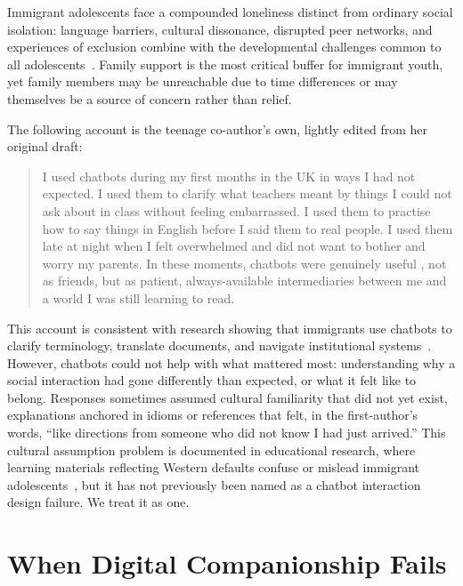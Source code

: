 \documentclass[manuscript]{acmart}
\begin{document}
Immigrant adolescents face a compounded loneliness distinct from ordinary social isolation:
language barriers, cultural dissonance, disrupted peer networks, and experiences of exclusion
combine with the developmental challenges common to all adolescents~\cite{aalto2025patterns}.
Family support is the most critical buffer for immigrant youth, yet family members may be
unreachable due to time differences or may themselves be a source of concern rather than relief.

The following account is the teenage co-author's own, lightly edited from her original draft:

\begin{quote}
I used chatbots during my first months in the UK in ways I had not expected. I used them to
clarify what teachers meant by things I could not ask about in class without feeling
embarrassed. I used them to practise how to say things in English before I said them to real
people. I used them late at night when I felt overwhelmed and did not want to bother and worry my parents.
In these moments, chatbots were genuinely useful , not as friends, but as patient,
always-available intermediaries between me and a world I was still learning to read.
\end{quote}

This account is consistent with research showing that immigrants use chatbots to clarify
terminology, translate documents, and navigate institutional
systems~\cite{Hosseini2025,DekkerEngbersen2014}. However, chatbots could not help with what
mattered most: understanding why a social interaction had gone differently than expected, or
what it felt like to belong. Responses sometimes assumed cultural familiarity that did not yet
exist, explanations anchored in idioms or references that felt, in the first-author's words,
``like directions from someone who did not know I had just arrived.'' This cultural
assumption problem is documented in educational research, where learning materials
reflecting Western defaults confuse or mislead immigrant adolescents~\cite{Tozadore2026}, but
it has not previously been named as a chatbot interaction design failure. We treat it as one.


\section{When Digital Companionship Fails}
\end{document}
